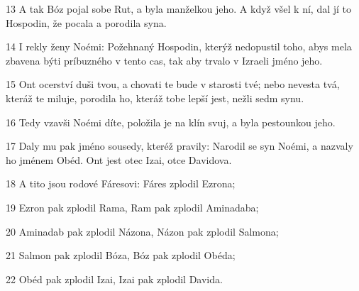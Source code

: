 \par 13 A tak Bóz pojal sobe Rut, a byla manželkou jeho. A když všel k ní, dal jí to Hospodin, že pocala a porodila syna.
\par 14 I rekly ženy Noémi: Požehnaný Hospodin, kterýž nedopustil toho, abys mela zbavena býti príbuzného v tento cas, tak aby trvalo v Izraeli jméno jeho.
\par 15 Ont ocerství duši tvou, a chovati te bude v starosti tvé; nebo nevesta tvá, kteráž te miluje, porodila ho, kteráž tobe lepší jest, nežli sedm synu.
\par 16 Tedy vzavši Noémi díte, položila je na klín svuj, a byla pestounkou jeho.
\par 17 Daly mu pak jméno sousedy, kteréž pravily: Narodil se syn Noémi, a nazvaly ho jménem Obéd. Ont jest otec Izai, otce Davidova.
\par 18 A tito jsou rodové Fáresovi: Fáres zplodil Ezrona;
\par 19 Ezron pak zplodil Rama, Ram pak zplodil Aminadaba;
\par 20 Aminadab pak zplodil Názona, Názon pak zplodil Salmona;
\par 21 Salmon pak zplodil Bóza, Bóz pak zplodil Obéda;
\par 22 Obéd pak zplodil Izai, Izai pak zplodil Davida.

